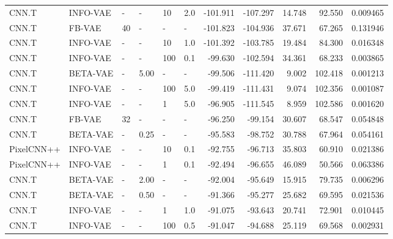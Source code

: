 \begin{table}[!htb]
\begin{tabular}{llllll|rrrrr}
      CNN.T &  INFO-VAE &         - &      - &    10 &  2.0 &     -101.911 &     -107.297 &      14.748 &      92.550 &   0.009465 \\
      CNN.T &    FB-VAE &        40 &      - &     - &      - &     -101.823 &     -104.936 &      37.671 &      67.265 &   0.131946 \\
      CNN.T &  INFO-VAE &         - &      - &    10 &  1.0 &     -101.392 &     -103.785 &      19.484 &      84.300 &   0.016348 \\
      CNN.T &  INFO-VAE &         - &      - &   100 &  0.1 &      -99.630 &     -102.594 &      34.361 &      68.233 &   0.003865 \\
      CNN.T &  BETA-VAE &         - &  5.00 &     - &      - &      -99.506 &     -111.420 &       9.002 &     102.418 &   0.001213 \\
      CNN.T &  INFO-VAE &         - &      - &   100 &  5.0 &      -99.419 &     -111.431 &       9.074 &     102.356 &   0.001087 \\
      CNN.T &  INFO-VAE &         - &      - &     1 &  5.0 &      -96.905 &     -111.545 &       8.959 &     102.586 &   0.001620 \\
      CNN.T &    FB-VAE &        32 &      - &     - &      - &      -96.250 &      -99.154 &      30.607 &      68.547 &   0.054848 \\
      CNN.T &  BETA-VAE &         - &  0.25 &     - &      - &      -95.583 &      -98.752 &      30.788 &      67.964 &   0.054161 \\
 PixelCNN++ &  INFO-VAE &         - &      - &    10 &  0.1 &      -92.755 &      -96.713 &      35.803 &      60.910 &   0.021386 \\
 PixelCNN++ &  INFO-VAE &         - &      - &     1 &  0.1 &      -92.494 &      -96.655 &      46.089 &      50.566 &   0.063386 \\
      CNN.T &  BETA-VAE &         - &  2.00 &     - &      - &      -92.004 &      -95.649 &      15.915 &      79.735 &   0.006296 \\
      CNN.T &  BETA-VAE &         - &  0.50 &     - &      - &      -91.366 &      -95.277 &      25.682 &      69.595 &   0.021536 \\
      CNN.T &  INFO-VAE &         - &      - &     1 &  1.0 &      -91.075 &      -93.643 &      20.741 &      72.901 &   0.010445 \\
      CNN.T &  INFO-VAE &         - &      - &   100 &  0.5 &      -91.047 &      -94.688 &      25.119 &      69.568 &   0.002931 \\

\end{tabular}
\end{table}
